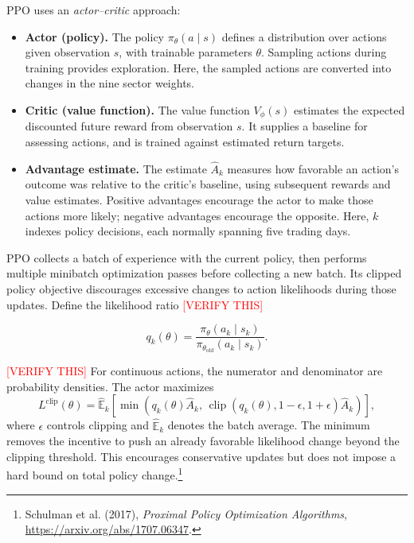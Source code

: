 \documentclass[11pt,letterpaper]{article}
\begin{document}
PPO uses an \emph{actor--critic} approach:
\begin{itemize}
  \item \textbf{Actor (policy).} The policy $\pi_\theta(a\mid s)$ defines a
  distribution over actions given observation $s$, with trainable parameters
  $\theta$. Sampling actions during training provides exploration. Here, the
  sampled actions are converted into changes in the nine sector weights.

  \item \textbf{Critic (value function).} The value function $V_\phi(s)$ estimates
  the expected discounted future reward from observation $s$. It supplies a
  baseline for assessing actions, and is trained against estimated return targets.

  \item \textbf{Advantage estimate.} The estimate $\widehat A_k$ measures how
  favorable an action's outcome was relative to the critic's baseline, using
  subsequent rewards and value estimates. Positive advantages encourage the
  actor to make those actions more likely; negative advantages encourage the
  opposite. Here, $k$ indexes policy decisions, each normally spanning five
  trading days.
\end{itemize}

PPO collects a batch of experience with the current policy, then performs
multiple minibatch optimization passes before collecting a new batch. Its
clipped policy objective discourages excessive changes to action likelihoods
during those updates. Define the likelihood ratio
\textcolor{red}{[VERIFY THIS]}

\[
  q_k(\theta)=
    \frac{\pi_\theta(a_k\mid s_k)}
         {\pi_{\theta_{\mathrm{old}}}(a_k\mid s_k)}.
\]

\textcolor{red}{[VERIFY THIS]}
For continuous actions, the numerator and denominator are probability densities.
The actor maximizes
\[
  L^{\mathrm{clip}}(\theta)=\widehat{\mathbb E}_k
    \left[\min\!\left(
      q_k(\theta)\widehat A_k,\,
      \operatorname{clip}(q_k(\theta),1-\epsilon,1+\epsilon)
        \widehat A_k
    \right)\right],
\]
where $\epsilon$ controls clipping and $\widehat{\mathbb E}_k$ denotes the batch
average. The minimum removes the incentive to push an already favorable
likelihood change beyond the clipping threshold. This encourages conservative
updates but does not impose a hard bound on total policy change.\footnote{Schulman
et al. (2017), \emph{Proximal Policy Optimization Algorithms},
\url{https://arxiv.org/abs/1707.06347}.}
\end{document}

